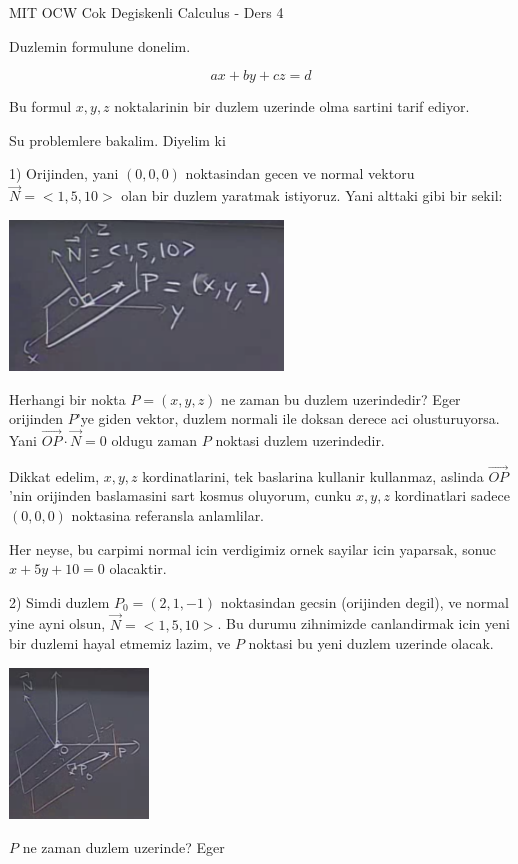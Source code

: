 \documentclass[12pt,fleqn]{article}
\begin{document}
MIT OCW Cok Degiskenli Calculus - Ders 4

Duzlemin formulune donelim. 

\[ ax + by + cz = d \]

Bu formul $x,y,z$ noktalarinin bir duzlem uzerinde olma sartini tarif
ediyor. 

Su problemlere bakalim. Diyelim ki 

1) Orijinden, yani $(0,0,0)$ noktasindan gecen ve normal vektoru $\vec{N} = <1,5,10>$
olan bir duzlem yaratmak istiyoruz. Yani alttaki gibi bir sekil:

\includegraphics[height=4cm]{4_1.png}

Herhangi bir nokta $P = (x,y,z)$  ne zaman bu duzlem uzerindedir? Eger
orijinden $P$'ye giden vektor, duzlem normali ile doksan derece aci
olusturuyorsa. Yani $\vec{OP} \cdot \vec{N} = 0$ oldugu zaman $P$ noktasi
duzlem uzerindedir. 

Dikkat edelim, $x,y,z$ kordinatlarini, tek baslarina kullanir kullanmaz,
aslinda $\vec{OP}$'nin orijinden baslamasini sart kosmus oluyorum, cunku
$x,y,z$ kordinatlari sadece $(0,0,0)$ noktasina referansla anlamlilar. 

Her neyse, bu carpimi normal icin verdigimiz ornek sayilar icin yaparsak,
sonuc $x+5y+10 = 0$ olacaktir.

2) Simdi duzlem $P_0 = (2,1,-1)$ noktasindan gecsin (orijinden degil), ve
normal yine ayni olsun, $\vec{N} = <1,5,10>$. Bu durumu zihnimizde
canlandirmak icin yeni bir duzlemi hayal etmemiz lazim, ve $P$ noktasi bu
yeni duzlem uzerinde olacak.

\includegraphics[height=4cm]{4_2.png}

$P$ ne zaman duzlem uzerinde? Eger 
\end{document}
